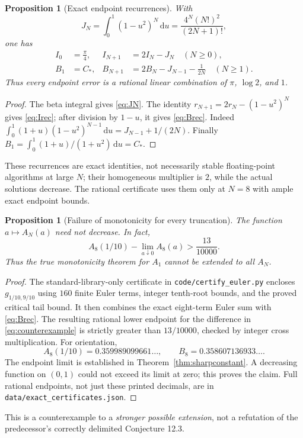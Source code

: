 \documentclass[11pt]{article}
\numberwithin{equation}{section}
\newtheorem{proposition}[theorem]{Proposition}
\theoremstyle{definition}\newtheorem{definition}[theorem]{Definition}
\theoremstyle{remark}\newtheorem{remark}[theorem]{Remark}
\newcommand{\dd}{\,\mathrm d}
\newcommand{\CC}{C_*}
\begin{document}
\begin{proposition}[Exact endpoint recurrences]\label{prop:endrec}
With
\begin{equation}\label{eq:JN}
 J_N=\int_0^1(1-u^2)^N\dd u
 =\frac{4^N(N!)^2}{(2N+1)!},
\end{equation}
one has
\begin{align}
 I_0&=\frac\pi4,& I_{N+1}&=2I_N-J_N\quad(N\ge0),\label{eq:Irec}\\
 B_1&=\CC,& B_{N+1}&=2B_N-J_{N-1}-\frac1{2N}\quad(N\ge1).
 \label{eq:Brec}
\end{align}
Thus every endpoint error is a rational linear combination of $\pi$,
$\log2$, and $1$.
\end{proposition}
\begin{proof}
The beta integral gives \eqref{eq:JN}. The identity
$r_{N+1}=2r_N-(1-u^2)^N$ gives \eqref{eq:Irec}; after division by
$1-u$, it gives \eqref{eq:Brec}. Indeed
$\int_0^1(1+u)(1-u^2)^{N-1}\dd u=J_{N-1}+1/(2N)$.
Finally $B_1=\int_0^1(1+u)/(1+u^2)\dd u=\CC$.
\end{proof}
These recurrences are exact identities, not necessarily stable
floating-point algorithms at large $N$; their homogeneous multiplier
is $2$, while the actual solutions decrease. The rational certificate
uses them only at $N=8$ with ample exact endpoint bounds.

\begin{proposition}[Failure of monotonicity for every truncation]
\label{prop:counterexample}
The function $a\mapsto A_N(a)$ need not decrease. In fact,
\begin{equation}\label{eq:counterexample}
 A_8(1/10)-\lim_{a\downarrow0}A_8(a)>\frac{13}{10000}.
\end{equation}
Thus the true monotonicity theorem for $A_1$ cannot be extended to all
$A_N$.
\end{proposition}
\begin{proof}
The standard-library-only certificate in
\texttt{code/certify\_euler.py} encloses $g_{1/10,9/10}$ using
$160$ finite Euler terms, integer tenth-root bounds, and the proved
critical tail bound. It then combines the exact eight-term Euler
sum with \eqref{eq:Brec}. The resulting rational lower endpoint for
the difference in \eqref{eq:counterexample} is strictly greater than
$13/10000$, checked by integer cross multiplication. For orientation,
\[
 A_8(1/10)=0.359989099661\ldots,\qquad
 B_8=0.358607136933\ldots.
\]
The endpoint limit is established in Theorem~\ref{thm:sharpconstant}.
A decreasing function on $(0,1)$ could not exceed its limit at zero;
this proves the claim. Full rational endpoints, not just these
printed decimals, are in \texttt{data/exact\_certificates.json}.
\end{proof}
This is a counterexample to a \emph{stronger possible extension}, not
a refutation of the predecessor's correctly delimited Conjecture 12.3.
\end{document}
